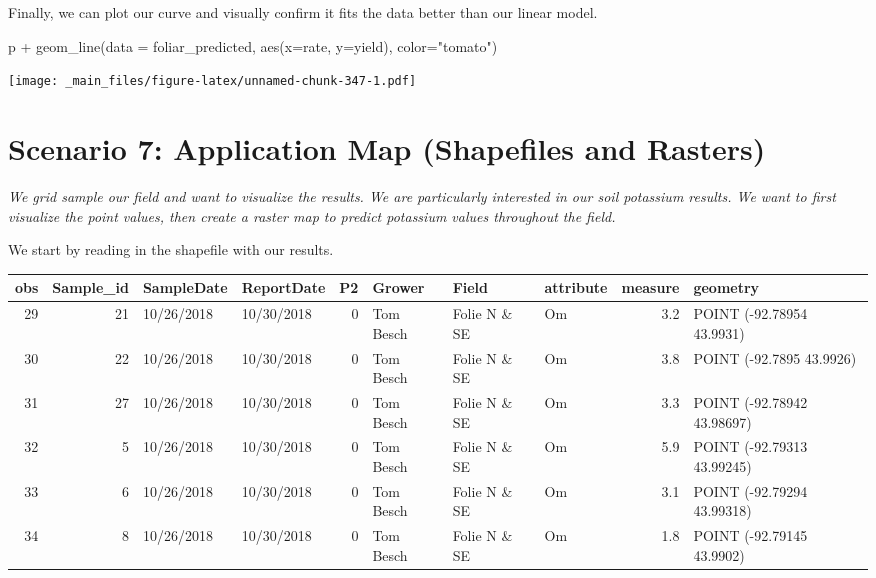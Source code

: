 \documentclass[
]{book}
\newenvironment{Shaded}{\begin{snugshade}}{\end{snugshade}}
\newcommand{\AttributeTok}[1]{\textcolor[rgb]{0.77,0.63,0.00}{#1}}
\newcommand{\FunctionTok}[1]{\textcolor[rgb]{0.00,0.00,0.00}{#1}}
\newcommand{\NormalTok}[1]{#1}
\newcommand{\OtherTok}[1]{\textcolor[rgb]{0.56,0.35,0.01}{#1}}
\newcommand{\SpecialCharTok}[1]{\textcolor[rgb]{0.00,0.00,0.00}{#1}}
\newcommand{\StringTok}[1]{\textcolor[rgb]{0.31,0.60,0.02}{#1}}
\begin{document}
\begin{Shaded}
\end{Shaded}

Finally, we can plot our curve and visually confirm it fits the data better than our linear model.

\begin{Shaded}
\begin{Highlighting}[]
\NormalTok{p }\SpecialCharTok{+} \FunctionTok{geom\_line}\NormalTok{(}\AttributeTok{data =}\NormalTok{ foliar\_predicted, }\FunctionTok{aes}\NormalTok{(}\AttributeTok{x=}\NormalTok{rate, }\AttributeTok{y=}\NormalTok{yield), }\AttributeTok{color=}\StringTok{"tomato"}\NormalTok{)}
\end{Highlighting}
\end{Shaded}

\texttt{[image: \_main\_files/figure-latex/unnamed-chunk-347-1.pdf]}

\hypertarget{scenario-7-application-map-shapefiles-and-rasters}{%
\section{Scenario 7: Application Map (Shapefiles and Rasters)}\label{scenario-7-application-map-shapefiles-and-rasters}}

\emph{We grid sample our field and want to visualize the results. We are particularly interested in our soil potassium results. We want to first visualize the point values, then create a raster map to predict potassium values throughout the field.}

We start by reading in the shapefile with our results.

\begin{tabular}[t]{r|r|l|l|r|l|l|l|r|l}
\hline
obs & Sample\_id & SampleDate & ReportDate & P2 & Grower & Field & attribute & measure & geometry\\
\hline
29 & 21 & 10/26/2018 & 10/30/2018 & 0 & Tom Besch & Folie N \& SE & Om & 3.2 & POINT (-92.78954 43.9931)\\
\hline
30 & 22 & 10/26/2018 & 10/30/2018 & 0 & Tom Besch & Folie N \& SE & Om & 3.8 & POINT (-92.7895 43.9926)\\
\hline
31 & 27 & 10/26/2018 & 10/30/2018 & 0 & Tom Besch & Folie N \& SE & Om & 3.3 & POINT (-92.78942 43.98697)\\
\hline
32 & 5 & 10/26/2018 & 10/30/2018 & 0 & Tom Besch & Folie N \& SE & Om & 5.9 & POINT (-92.79313 43.99245)\\
\hline
33 & 6 & 10/26/2018 & 10/30/2018 & 0 & Tom Besch & Folie N \& SE & Om & 3.1 & POINT (-92.79294 43.99318)\\
\hline
34 & 8 & 10/26/2018 & 10/30/2018 & 0 & Tom Besch & Folie N \& SE & Om & 1.8 & POINT (-92.79145 43.9902)\\
\hline
\end{tabular}
\end{document}

